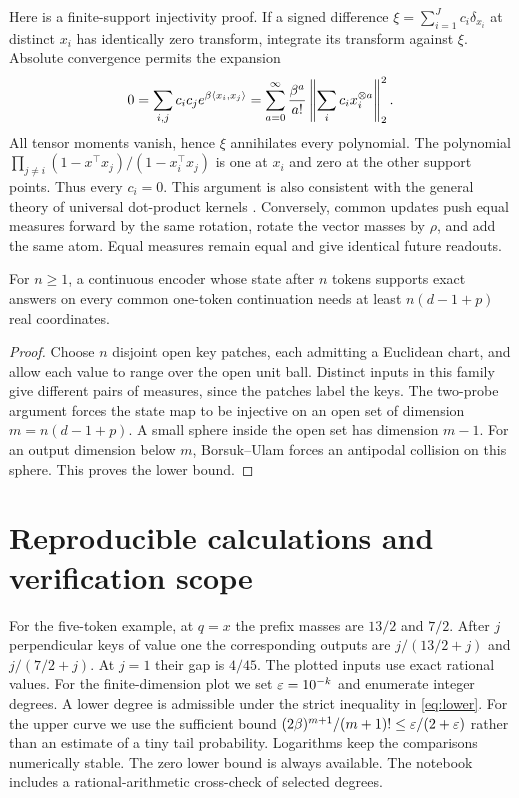 Here is a finite-support injectivity proof. If a signed difference $\xi=\sum_{i=1}^J c_i\delta_{x_i}$ at distinct $x_i$ has identically zero transform, integrate its transform against $\xi$. Absolute convergence permits the expansion
\begin{equation}
 0=\sum_{i,j}c_i c_j e^{\beta\langle x_i,x_j\rangle}
 =\sum_{a=0}^{\infty}\frac{\beta^a}{a!}
 \left\|\sum_i c_i x_i^{\otimes a}\right\|_2^2.\label{eq:ident}
\end{equation}
All tensor moments vanish, hence $\xi$ annihilates every polynomial. The polynomial
$\prod_{j\ne i}(1-x^\top x_j)/(1-x_i^\top x_j)$ is one at $x_i$ and zero at the other support points. Thus every $c_i=0$. This argument is also consistent with the general theory of universal dot-product kernels \cite{universal}. Conversely, common updates push equal measures forward by the same rotation, rotate the vector masses by $\rho$, and add the same atom. Equal measures remain equal and give identical future readouts.

\begin{corollary}\label{cor:exact}
For $n\ge1$, a continuous encoder whose state after $n$ tokens supports exact answers on every common one-token continuation needs at least $n(d-1+p)$ real coordinates.
\end{corollary}
\begin{proof}
Choose $n$ disjoint open key patches, each admitting a Euclidean chart, and allow each value to range over the open unit ball. Distinct inputs in this family give different pairs of measures, since the patches label the keys. The two-probe argument forces the state map to be injective on an open set of dimension $m=n(d-1+p)$. A small sphere inside the open set has dimension $m-1$. For an output dimension below $m$, Borsuk--Ulam forces an antipodal collision on this sphere. This proves the lower bound.
\end{proof}

\section{Reproducible calculations and verification scope}\label{sec:checks}
For the five-token example, at $q=x$ the prefix masses are $13/2$ and $7/2$. After $j$ perpendicular keys of value one the corresponding outputs are $j/(13/2+j)$ and $j/(7/2+j)$. At $j=1$ their gap is $4/45$. The plotted inputs use exact rational values. For the finite-dimension plot we set $\varepsilon=10^{-k}$ and enumerate integer degrees. A lower degree is admissible under the strict inequality in \eqref{eq:lower}. For the upper curve we use the sufficient bound $(2\beta)^{m+1}/(m+1)!\le\varepsilon/(2+\varepsilon)$ rather than an estimate of a tiny tail probability. Logarithms keep the comparisons numerically stable. The zero lower bound is always available. The notebook includes a rational-arithmetic cross-check of selected degrees.

